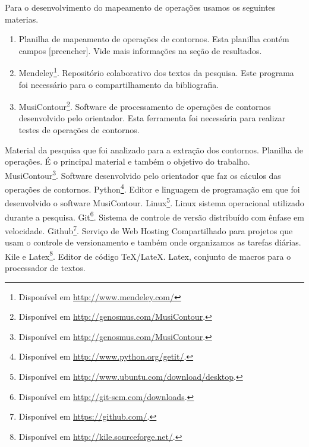 \documentclass[11pt]{article}
\begin{document}
\label{sec:materiais}

Para o desenvolvimento do mapeamento de operações usamos os seguintes materias.


\begin{enumerate}
\item Planilha de mapeamento de operações de contornos. Esta planilha
  contém campos [preencher]. Vide mais informações na seção de
  resultados.
\item Mendeley\footnote{Disponível em
    \url{http://www.mendeley.com/}}. Repositório colaborativo dos
  textos da pesquisa. Este programa foi necessário para o
  compartilhamento da bibliografia.
\item MusiContour\footnote{Disponível em
    \url{http://genosmus.com/MusiContour}.}. Software de processamento
  de operações de contornos desenvolvido pelo orientador. Esta
  ferramenta foi necessária para realizar testes de operações de
  contornos.
\end{enumerate}

Material da pesquisa que foi analizado para a extração dos contornos.
Planilha de operações. É o principal material e também o
objetivo do trabalho.
MusiContour\footnote{Disponível em
  \url{http://genosmus.com/MusiContour}.}. Software desenvolvido pelo
orientador que faz os cáculos das operações de contornos.
Python\footnote{Disponível em
  \url{http://www.python.org/getit/}.}. Editor e linguagem de
programação em que foi desenvolvido o software MusiContour.
Linux\footnote{Disponível em
  \url{http://www.ubuntu.com/download/desktop}.}. Linux sistema
operacional utilizado durante a pesquisa.  Git\footnote{Disponível em
  \url{http://git-scm.com/downloads}.}. Sistema de controle de versão
distribuído com ênfase em velocidade.  Github\footnote{Disponível em
  \url{https://github.com/}.}. Serviço de Web Hosting Compartilhado
para projetos que usam o controle de versionamento e também onde
organizamos as tarefas diárias.  Kile e Latex\footnote{Disponível em
  \url{http://kile.sourceforge.net/}.}. Editor de código
TeX/LateX. Latex, conjunto de macros para o processador de textos.
\end{document}
